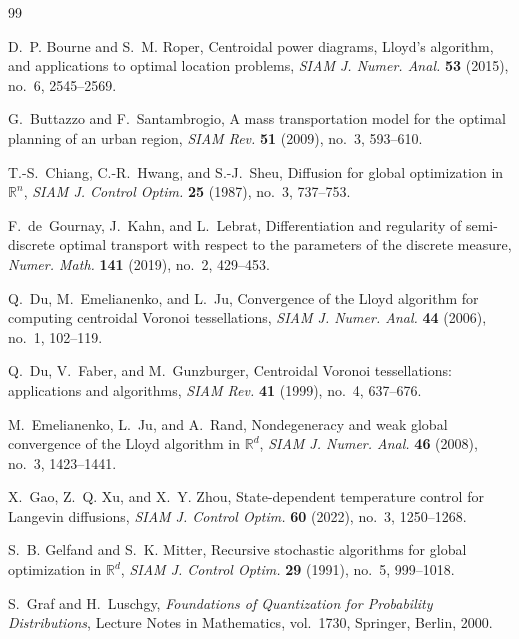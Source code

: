 \documentclass[11pt]{article}
\theoremstyle{definition}
\theoremstyle{remark}
\numberwithin{equation}{section}
\begin{document}
\begin{thebibliography}{99}

D.~P. Bourne and S.~M. Roper,
\newblock Centroidal power diagrams, Lloyd's algorithm, and applications to optimal location problems,
\newblock \emph{SIAM J. Numer. Anal.} \textbf{53} (2015), no.~6, 2545--2569.

G.~Buttazzo and F.~Santambrogio,
\newblock A mass transportation model for the optimal planning of an urban region,
\newblock \emph{SIAM Rev.} \textbf{51} (2009), no.~3, 593--610.

T.-S.~Chiang, C.-R.~Hwang, and S.-J.~Sheu,
\newblock Diffusion for global optimization in $\mathbb R^n$,
\newblock \emph{SIAM J. Control Optim.} \textbf{25} (1987), no.~3, 737--753.

F.~de~Gournay, J.~Kahn, and L.~Lebrat,
\newblock Differentiation and regularity of semi-discrete optimal transport with respect to the parameters of the discrete measure,
\newblock \emph{Numer. Math.} \textbf{141} (2019), no.~2, 429--453.

Q.~Du, M.~Emelianenko, and L.~Ju,
\newblock Convergence of the Lloyd algorithm for computing centroidal Voronoi tessellations,
\newblock \emph{SIAM J. Numer. Anal.} \textbf{44} (2006), no.~1, 102--119.

Q.~Du, V.~Faber, and M.~Gunzburger,
\newblock Centroidal Voronoi tessellations: applications and algorithms,
\newblock \emph{SIAM Rev.} \textbf{41} (1999), no.~4, 637--676.

M.~Emelianenko, L.~Ju, and A.~Rand,
\newblock Nondegeneracy and weak global convergence of the Lloyd algorithm in $\mathbb R^d$,
\newblock \emph{SIAM J. Numer. Anal.} \textbf{46} (2008), no.~3, 1423--1441.


X.~Gao, Z.~Q. Xu, and X.~Y. Zhou,
\newblock State-dependent temperature control for Langevin diffusions,
\newblock \emph{SIAM J. Control Optim.} \textbf{60} (2022), no.~3, 1250--1268.

S.~B. Gelfand and S.~K. Mitter,
\newblock Recursive stochastic algorithms for global optimization in $\mathbb R^d$,
\newblock \emph{SIAM J. Control Optim.} \textbf{29} (1991), no.~5, 999--1018.

S.~Graf and H.~Luschgy,
\newblock \emph{Foundations of Quantization for Probability Distributions},
\newblock Lecture Notes in Mathematics, vol.~1730, Springer, Berlin, 2000.


\end{thebibliography}
\end{document}
